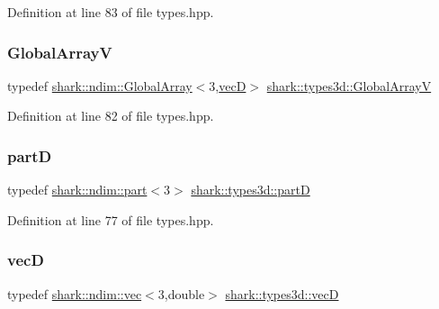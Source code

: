 Definition at line 83 of file types.\+hpp.

\hypertarget{namespaceshark_1_1types3d_aec3cdabf4a11526d4bbaebbc71f5071c}{}\label{namespaceshark_1_1types3d_aec3cdabf4a11526d4bbaebbc71f5071c} 
\subsubsection{\texorpdfstring{Global\+ArrayV}{GlobalArrayV}}
{\footnotesize\ttfamily typedef \hyperlink{classshark_1_1ndim_1_1_global_array}{shark\+::ndim\+::\+Global\+Array}$<$3,\hyperlink{namespaceshark_1_1types3d_a2ad4ea08e8e6d62a99ffef91988c717c}{vecD}$>$ \hyperlink{namespaceshark_1_1types3d_aec3cdabf4a11526d4bbaebbc71f5071c}{shark\+::types3d\+::\+Global\+ArrayV}}



Definition at line 82 of file types.\+hpp.

\hypertarget{namespaceshark_1_1types3d_a8ba1ca83346f7674ce78342d0dc516ce}{}\label{namespaceshark_1_1types3d_a8ba1ca83346f7674ce78342d0dc516ce} 
\subsubsection{\texorpdfstring{partD}{partD}}
{\footnotesize\ttfamily typedef \hyperlink{structshark_1_1ndim_1_1part}{shark\+::ndim\+::part}$<$3$>$ \hyperlink{namespaceshark_1_1types3d_a8ba1ca83346f7674ce78342d0dc516ce}{shark\+::types3d\+::partD}}



Definition at line 77 of file types.\+hpp.

\hypertarget{namespaceshark_1_1types3d_a2ad4ea08e8e6d62a99ffef91988c717c}{}\label{namespaceshark_1_1types3d_a2ad4ea08e8e6d62a99ffef91988c717c} 
\subsubsection{\texorpdfstring{vecD}{vecD}}
{\footnotesize\ttfamily typedef \hyperlink{structshark_1_1ndim_1_1vec}{shark\+::ndim\+::vec}$<$3,double$>$ \hyperlink{namespaceshark_1_1types3d_a2ad4ea08e8e6d62a99ffef91988c717c}{shark\+::types3d\+::vecD}}



